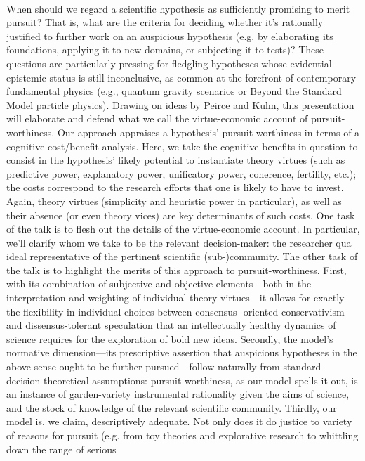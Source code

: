 \documentclass[11pt]{article}
\begin{document}
\

When should we regard a scientific hypothesis as sufficiently promising to merit pursuit? That is, what
are the criteria for deciding whether it’s rationally justified to further work on an auspicious hypothesis
(e.g. by elaborating its foundations, applying it to new domains, or subjecting it to tests)? These
questions are particularly pressing for fledgling hypotheses whose evidential-epistemic status is still
inconclusive, as common at the forefront of contemporary fundamental physics (e.g., quantum gravity
scenarios or Beyond the Standard Model particle physics). Drawing on ideas by Peirce and Kuhn, this
presentation will elaborate and defend what we call the virtue-economic account of pursuit-worthiness.
Our approach appraises a hypothesis’ pursuit-worthiness in terms of a cognitive cost/benefit analysis.
Here, we take the cognitive benefits in question to consist in the hypothesis’ likely potential to instantiate
theory virtues (such as predictive power, explanatory power, unificatory power, coherence, fertility, etc.);
the costs correspond to the research efforts that one is likely to have to invest. Again, theory virtues
(simplicity and heuristic power in particular), as well as their absence (or even theory vices) are key
determinants of such costs. One task of the talk is to flesh out the details of the virtue-economic account.
In particular, we’ll clarify whom we take to be the relevant decision-maker: the researcher qua ideal
representative of the pertinent scientific (sub-)community.
The other task of the talk is to highlight the merits of this approach to pursuit-worthiness. First, with its
combination of subjective and objective elements—both in the interpretation and weighting of
individual theory virtues—it allows for exactly the flexibility in individual choices between consensus-
oriented conservativism and dissensus-tolerant speculation that an intellectually healthy dynamics of
science requires for the exploration of bold new ideas.
Secondly, the model’s normative dimension—its prescriptive assertion that auspicious hypotheses in the
above sense ought to be further pursued—follow naturally from standard decision-theoretical
assumptions: pursuit-worthiness, as our model spells it out, is an instance of garden-variety instrumental
rationality given the aims of science, and the stock of knowledge of the relevant scientific community.
Thirdly, our model is, we claim, descriptively adequate. Not only does it do justice to variety of reasons
for pursuit (e.g. from toy theories and explorative research to whittling down the range of serious
\end{document}
